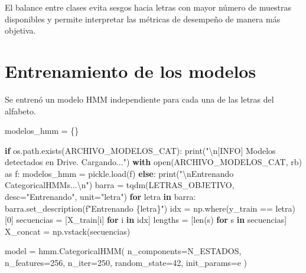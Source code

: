 \documentclass[
  spanish,
  us-letterpaper,
  DIV=11,
  numbers=noendperiod]{scrreprt}
\newenvironment{Shaded}{\begin{snugshade}}{\end{snugshade}}
\newcommand{\BuiltInTok}[1]{\textcolor[rgb]{0.00,0.23,0.31}{#1}}
\newcommand{\CharTok}[1]{\textcolor[rgb]{0.13,0.47,0.30}{#1}}
\newcommand{\ControlFlowTok}[1]{\textcolor[rgb]{0.00,0.23,0.31}{\textbf{#1}}}
\newcommand{\DecValTok}[1]{\textcolor[rgb]{0.68,0.00,0.00}{#1}}
\newcommand{\ImportTok}[1]{\textcolor[rgb]{0.00,0.46,0.62}{#1}}
\newcommand{\KeywordTok}[1]{\textcolor[rgb]{0.00,0.23,0.31}{\textbf{#1}}}
\newcommand{\NormalTok}[1]{\textcolor[rgb]{0.00,0.23,0.31}{#1}}
\newcommand{\OperatorTok}[1]{\textcolor[rgb]{0.37,0.37,0.37}{#1}}
\newcommand{\SpecialCharTok}[1]{\textcolor[rgb]{0.37,0.37,0.37}{#1}}
\newcommand{\SpecialStringTok}[1]{\textcolor[rgb]{0.13,0.47,0.30}{#1}}
\newcommand{\StringTok}[1]{\textcolor[rgb]{0.13,0.47,0.30}{#1}}
\begin{document}
El balance entre clases evita sesgos hacia letras con mayor número de
muestras disponibles y permite interpretar las métricas de desempeño de
manera más objetiva.

\section{Entrenamiento de los
modelos}\label{entrenamiento-de-los-modelos}

Se entrenó un modelo HMM independiente para cada una de las letras del
alfabeto.

\begin{Shaded}
\begin{Highlighting}[]
\NormalTok{modelos\_hmm }\OperatorTok{=}\NormalTok{ \{\}}

\ControlFlowTok{if}\NormalTok{ os.path.exists(ARCHIVO\_MODELOS\_CAT):}
    \BuiltInTok{print}\NormalTok{(}\StringTok{"}\CharTok{\textbackslash{}n}\StringTok{[INFO] Modelos detectados en Drive. Cargando..."}\NormalTok{)}
    \ControlFlowTok{with} \BuiltInTok{open}\NormalTok{(ARCHIVO\_MODELOS\_CAT, }\StringTok{\textquotesingle{}rb\textquotesingle{}}\NormalTok{) }\ImportTok{as}\NormalTok{ f:}
\NormalTok{        modelos\_hmm }\OperatorTok{=}\NormalTok{ pickle.load(f)}
\ControlFlowTok{else}\NormalTok{:}
    \BuiltInTok{print}\NormalTok{(}\StringTok{"}\CharTok{\textbackslash{}n}\StringTok{Entrenando CategoricalHMMs...}\CharTok{\textbackslash{}n}\StringTok{"}\NormalTok{)}
\NormalTok{    barra }\OperatorTok{=}\NormalTok{ tqdm(LETRAS\_OBJETIVO, desc}\OperatorTok{=}\StringTok{"Entrenando"}\NormalTok{, unit}\OperatorTok{=}\StringTok{"letra"}\NormalTok{)}
    \ControlFlowTok{for}\NormalTok{ letra }\KeywordTok{in}\NormalTok{ barra:}
\NormalTok{        barra.set\_description(}\SpecialStringTok{f"Entrenando \textquotesingle{}}\SpecialCharTok{\{}\NormalTok{letra}\SpecialCharTok{\}}\SpecialStringTok{\textquotesingle{}"}\NormalTok{)}
\NormalTok{        idx }\OperatorTok{=}\NormalTok{ np.where(y\_train }\OperatorTok{==}\NormalTok{ letra)[}\DecValTok{0}\NormalTok{]}
\NormalTok{        secuencias }\OperatorTok{=}\NormalTok{ [X\_train[i] }\ControlFlowTok{for}\NormalTok{ i }\KeywordTok{in}\NormalTok{ idx]}
\NormalTok{        lengths }\OperatorTok{=}\NormalTok{ [}\BuiltInTok{len}\NormalTok{(s) }\ControlFlowTok{for}\NormalTok{ s }\KeywordTok{in}\NormalTok{ secuencias]}
\NormalTok{        X\_concat }\OperatorTok{=}\NormalTok{ np.vstack(secuencias)}

\NormalTok{        model }\OperatorTok{=}\NormalTok{ hmm.CategoricalHMM(}
\NormalTok{            n\_components}\OperatorTok{=}\NormalTok{N\_ESTADOS,}
\NormalTok{            n\_features}\OperatorTok{=}\DecValTok{256}\NormalTok{, }
\NormalTok{            n\_iter}\OperatorTok{=}\DecValTok{250}\NormalTok{,}
\NormalTok{            random\_state}\OperatorTok{=}\DecValTok{42}\NormalTok{,}
\NormalTok{            init\_params}\OperatorTok{=}\StringTok{\textquotesingle{}e\textquotesingle{}}
\NormalTok{        )}


\end{Highlighting}
\end{Shaded}
\end{document}
